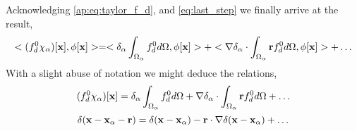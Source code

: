 Acknowledging \ref{ap:eq:taylor_f_d}, and \ref{eq:last_step} we finally arrive at the result, 
\begin{align}
    <   (f^0_d \chi_\alpha)[\textbf{x}]
    , \phi[\textbf{x}]> 
    = 
    <\delta_\alpha
    \intO{
        f^0_d
    }
    , \phi[\textbf{x}]>
    + < \grad\delta_\alpha
    \cdot 
    \intO{
    \textbf{r}
    f^0_d
     }
     , \phi[\textbf{x}]>
    + \ldots
    \label{eq:last2_step}
\end{align}
With a slight abuse of notation we might deduce the relations, 
\begin{equation}
    (f^0_d \chi_\alpha)[\textbf{x}]
    = 
    \delta_\alpha
    \int_{\Omega_{\alpha}} 
        f^0_d
     d\Omega
    + \mathbf{\nabla}\delta_\alpha
    \cdot 
    \int_{\Omega_{\alpha}} 
    \textbf{r}
    f^0_d
      d\Omega
    + \ldots
\end{equation}
\begin{equation}
    \delta(\textbf{x}- \textbf{x}_\alpha - \textbf{r})
    = 
    \delta(\textbf{x}- \textbf{x}_\alpha)
    - \textbf{r}\cdot \mathbf{\nabla}\delta(\textbf{x}- \textbf{x}_\alpha)
    + \ldots
\end{equation}
